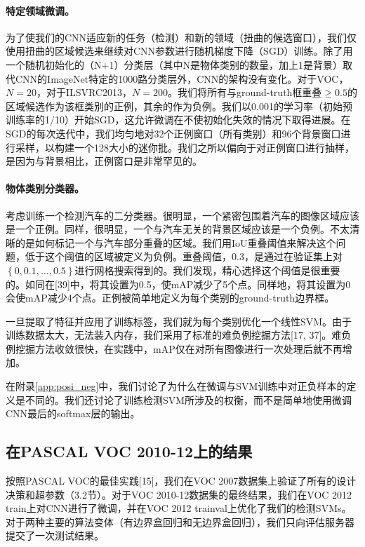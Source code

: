 \documentclass[../main.tex]{subfile}
\begin{document}
\paragraph{特定领域微调。}为了使我们的CNN适应新的任务（检测）和新的领域（扭曲的候选窗口），我们仅使用扭曲的区域候选来继续对CNN参数进行随机梯度下降（SGD）训练。除了用一个随机初始化的（N+1）分类层（其中N是物体类别的数量，加上1是背景）取代CNN的ImageNet特定的1000路分类层外，CNN的架构没有变化。对于VOC，$N=20$，对于ILSVRC2013，$N=200$。我们将所有与ground-truth框重叠$\geq 0.5$的区域候选作为该框类别的正例，其余的作为负例。我们以0.001的学习率（初始预训练率的1/10）开始SGD，这允许微调在不使初始化失效的情况下取得进展。在SGD的每次迭代中，我们均匀地对32个正例窗口（所有类别）和96个背景窗口进行采样，以构建一个128大小的迷你批。我们之所以偏向于对正例窗口进行抽样，是因为与背景相比，正例窗口是非常罕见的。

\paragraph{物体类别分类器。}考虑训练一个检测汽车的二分类器。很明显，一个紧密包围着汽车的图像区域应该是一个正例。同样，很明显，一个与汽车无关的背景区域应该是一个负例。不太清晰的是如何标记一个与汽车部分重叠的区域。我们用IoU重叠阈值来解决这个问题，低于这个阈值的区域被定义为负例。重叠阈值，0.3，是通过在验证集上对$\left\{ 0, 0.1, \ldots, 0.5 \right\}$进行网格搜索得到的。我们发现，精心选择这个阈值是很重要的。如同在[39]中，将其设置为0.5，使mAP减少了5个点。同样地，将其设置为0会使mAP减少4个点。正例被简单地定义为每个类别的ground-truth边界框。

一旦提取了特征并应用了训练标签，我们就为每个类别优化一个线性SVM。由于训练数据太大，无法装入内存，我们采用了标准的难负例挖掘方法[17, 37]。难负例挖掘方法收敛很快，在实践中，mAP仅在对所有图像进行一次处理后就不再增加。

在附录\ref{app:posi_neg}中，我们讨论了为什么在微调与SVM训练中对正负样本的定义是不同的。我们还讨论了训练检测SVM所涉及的权衡，而不是简单地使用微调CNN最后的softmax层的输出。

\subsection{在PASCAL VOC 2010-12上的结果}

按照PASCAL VOC的最佳实践[15]，我们在VOC 2007数据集上验证了所有的设计决策和超参数（3.2节）。对于VOC 2010-12数据集的最终结果，我们在VOC 2012 train上对CNN进行了微调，并在VOC 2012 trainval上优化了我们的检测SVMs。对于两种主要的算法变体（有边界盒回归和无边界盒回归），我们只向评估服务器提交了一次测试结果。
\end{document}
